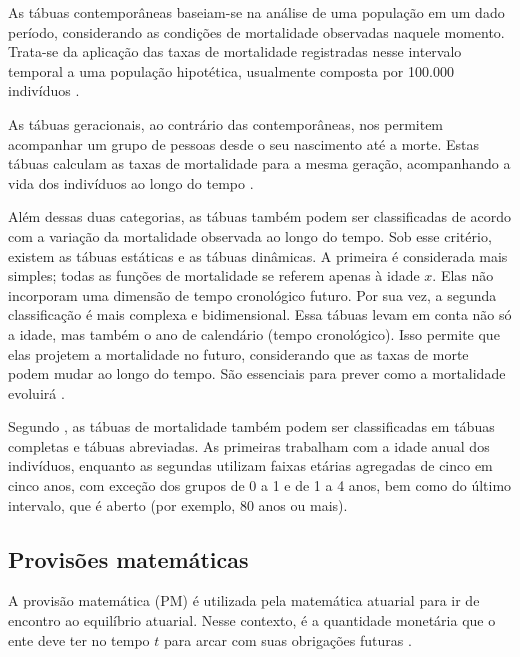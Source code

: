As tábuas contemporâneas baseiam-se na análise de uma população em um dado período, considerando as condições de mortalidade observadas naquele momento. Trata-se da aplicação das taxas de mortalidade registradas nesse intervalo temporal a uma população hipotética, usualmente composta por 100.000 indivíduos \cite{bravo2007, ortega1987}.

As tábuas geracionais, ao contrário das contemporâneas, nos permitem acompanhar um grupo de pessoas desde o seu nascimento até a morte. Estas tábuas calculam as taxas de mortalidade para a mesma geração, acompanhando a vida dos indivíduos ao longo do tempo \cite{bravo2007, ortega1987}.

Além dessas duas categorias, as tábuas também podem ser classificadas de acordo com a variação da mortalidade observada ao longo do tempo. Sob esse critério, existem as tábuas estáticas e as tábuas dinâmicas. A primeira é considerada mais simples; todas as funções de mortalidade se referem apenas à idade $x$. Elas não incorporam uma dimensão de tempo cronológico futuro. Por sua vez, a segunda classificação é mais complexa e bidimensional. Essa tábuas levam em conta não só a idade, mas também o ano de calendário (tempo cronológico). Isso permite que elas projetem a mortalidade no futuro, considerando que as taxas de morte podem mudar ao longo do tempo. São essenciais para prever como a mortalidade evoluirá \cite{bravo2007}.

Segundo , as tábuas de mortalidade também podem ser classificadas em tábuas completas e tábuas abreviadas. As primeiras trabalham com a idade anual dos indivíduos, enquanto as segundas utilizam faixas etárias agregadas de cinco em cinco anos, com exceção dos grupos de 0 a 1 e de 1 a 4 anos, bem como do último intervalo, que é aberto (por exemplo, 80 anos ou mais).

\subsection{Provisões matemáticas}
A provisão matemática (PM) é utilizada pela matemática atuarial para ir de encontro ao equilíbrio atuarial. Nesse contexto, é a quantidade monetária que o ente deve ter no tempo $t$ para arcar com suas obrigações futuras \cite{cordeiro2014calculo, vilanoca1969}.

